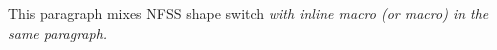 This paragraph mixes NFSS shape switch \itshape with inline \textit{macro} (or \emph{macro}) in the same paragraph.

